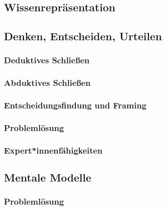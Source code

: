 		\subsection{Wissenrepräsentation} %

		\subsection{Denken, Entscheiden, Urteilen} %

			\subsubsection{Deduktives Schließen} %

			\subsubsection{Abduktives Schließen} %

			\subsubsection{Entscheidungsfindung und Framing} %

			\subsubsection{Problemlösung} %

			\subsubsection{Expert*innenfähigkeiten} %

		\subsection{Mentale Modelle} %

			\subsubsection{Problemlösung} %

